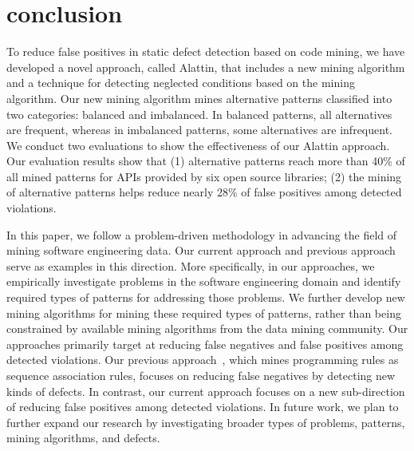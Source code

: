 \section{conclusion}
\label{sec:conclusion}

To reduce false positives in static defect detection based on code mining, we have developed a novel approach, called Alattin, that includes a new mining algorithm and a technique for detecting neglected conditions based on the mining algorithm. Our new mining algorithm mines alternative patterns classified into two categories: balanced and imbalanced. 
In balanced patterns, all alternatives are frequent, whereas in imbalanced patterns, some alternatives are infrequent.
We conduct two evaluations to show the effectiveness of our Alattin approach. Our evaluation results show that (1) alternative patterns reach more than 40\% of all mined patterns for APIs provided by six open source libraries; (2) the mining of alternative patterns helps reduce nearly 28\% of false positives among detected violations.

In this paper, we follow a problem-driven methodology in advancing the field of mining software engineering data. Our current approach and previous approach~\cite{thummalapenta09:mining} serve as examples in this direction. More specifically, in our approaches, we empirically investigate problems in the software engineering domain and identify required types of patterns for addressing those problems. We further develop new mining algorithms for mining these required types of patterns, rather than being constrained by available mining algorithms from the data mining community. Our approaches primarily target at reducing false negatives and false positives among detected violations. Our previous approach~\cite{thummalapenta09:mining}, which mines programming rules as sequence association rules, focuses on reducing
false negatives by detecting new kinds of defects. In contrast, our current approach focuses on a new sub-direction of reducing false positives among detected violations. In future work, we plan to further expand our research by investigating broader types of problems, patterns, mining algorithms, and defects.